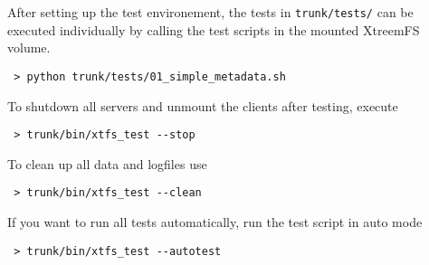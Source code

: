 After setting up the test environement, the tests in \texttt{trunk/tests/} can be executed individually by calling the test scripts in the mounted XtreemFS volume.

\begin{verbatim}
 > python trunk/tests/01_simple_metadata.sh
\end{verbatim}

To shutdown all servers and unmount the clients after testing, execute

\begin{verbatim}
 > trunk/bin/xtfs_test --stop
\end{verbatim}

To clean up all data and logfiles use

\begin{verbatim}
 > trunk/bin/xtfs_test --clean
\end{verbatim}

If you want to run all tests automatically, run the test script in auto mode

\begin{verbatim}
 > trunk/bin/xtfs_test --autotest
\end{verbatim}
